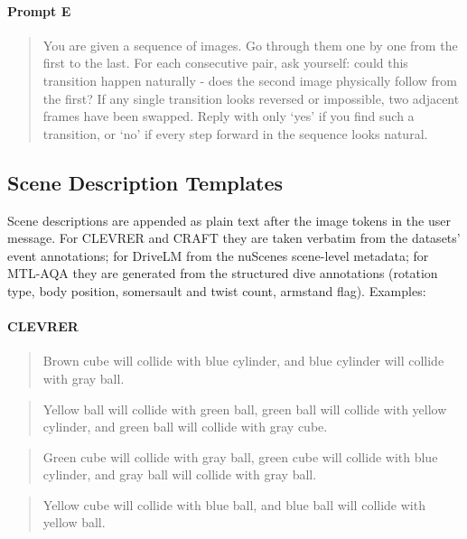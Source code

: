\documentclass[11pt]{article}
\begin{document}
\paragraph{Prompt E}
\begin{quote}
\ttfamily
You are given a sequence of images. Go through them one by one
from the first to the last. For each consecutive pair, ask yourself:
could this transition happen naturally - does the second image
physically follow from the first? If any single transition looks reversed
or impossible, two adjacent frames have been swapped. Reply with only
`yes' if you find such a transition, or `no' if every step forward in
the sequence looks natural.
\end{quote}

\subsection{Scene Description Templates}
\label{appendix:scene_description}

Scene descriptions are appended as plain text after the image tokens in the user message. For CLEVRER and CRAFT they are taken verbatim from the datasets' event annotations; for DriveLM from the nuScenes scene-level metadata; for MTL-AQA they are generated from the structured dive annotations (rotation type, body position, somersault and twist count, armstand flag). Examples:

\paragraph{CLEVRER}
\begin{quote}
Brown cube will collide with blue cylinder, and blue cylinder will collide with gray ball.
\end{quote}
\begin{quote}
Yellow ball will collide with green ball, green ball will collide with yellow cylinder, and green ball will collide with gray cube.
\end{quote}
\begin{quote}
Green cube will collide with gray ball, green cube will collide with blue cylinder, and gray ball will collide with gray ball.
\end{quote}
\begin{quote}
Yellow cube will collide with blue ball, and blue ball will collide with yellow ball.
\end{quote}
\end{document}
